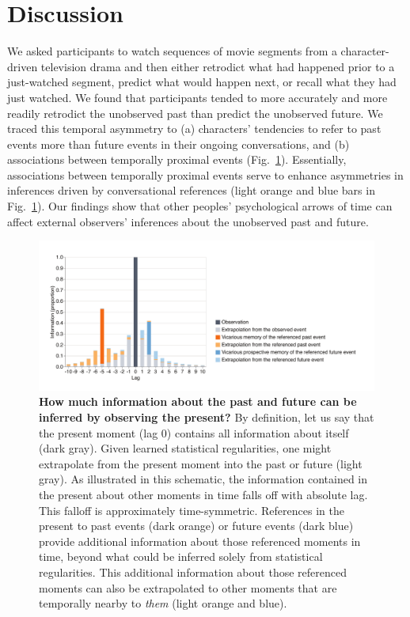 \documentclass[10pt]{article}
\begin{document}
\section*{Discussion}

We asked participants to watch sequences of movie segments from a
character-driven television drama and then either retrodict what had happened
prior to a just-watched segment, predict what would happen next, or recall what
they had just watched. We found that participants tended to more accurately and
more readily retrodict the unobserved past than predict the unobserved future.
We traced this temporal asymmetry to (a) characters' tendencies to refer to
past events more than future events in their ongoing conversations, and (b)
associations between temporally proximal events (Fig.~\ref{fig:discussion}).
Essentially, associations between temporally proximal events serve to enhance
asymmetries in inferences driven by conversational references (light orange and
blue bars in Fig.~\ref{fig:discussion}). Our findings show that other peoples'
psychological arrows of time can affect external observers' inferences about
the unobserved past and future.

\begin{figure}[tp]
  \centering
  \includegraphics[width=\textwidth]{discussion}

  \caption{\textbf{How much information about the past and future can be
  inferred by observing the present?} By definition, let us say that the
  present moment (lag 0) contains all information about itself (dark gray).
  Given learned statistical regularities, one might extrapolate from the
  present moment into the past or future (light gray). As illustrated in this
  schematic, the information contained in the present about other moments in
  time falls off with absolute lag. This falloff is approximately
  time-symmetric. References in the present to past events (dark orange) or
  future events (dark blue) provide additional information about those
  referenced moments in time, beyond what could be inferred solely from
  statistical regularities. This additional information about those referenced
  moments can also be extrapolated to other moments that are temporally nearby
  to \textit{them} (light orange and blue).}

  \label{fig:discussion}
\end{figure}
\end{document}
